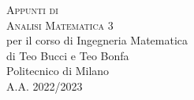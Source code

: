 \documentclass[10pt,a4paper,twoside]{book}
\begin{document}
\frontmatter

\pagestyle{empty}


\hypertarget{mytitlepage}{} %

\vspace*{\fill}

\begin{center}
	{\large \textsc{Appunti di}}\\
	\vspace*{0.4cm}
	{\Huge \textsc{Analisi Matematica 3}}\\
	\vspace*{1cm}
	{\large per il corso di Ingegneria Matematica}\\
	\vspace*{0.4cm}
	{\large {di Teo Bucci e Teo Bonfa}}\\
	\vspace*{1cm}
	Politecnico di Milano\\
	A.A. 2022/2023
\end{center}
\vspace*{\fill}
\clearpage


\hypertarget{mycopyright}{} %

\clearpage


% 


\cleardoublepage
\pagestyle{toc}
\hypertarget{mytoc}{} %
\bookmark[dest=mytoc,level=chapter]{\contentsname} %
\tableofcontents
\cleardoublepage


\pagestyle{fancy}
\mainmatter

 \cleardoublepage

\end{document}
